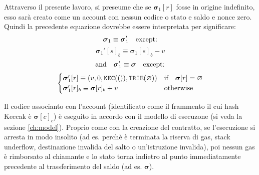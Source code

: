 \documentclass[9pt,oneside]{amsart}
\begin{document}
\begin{multicols}{2}
Attraverso il presente lavoro, si preseume che se $\boldsymbol{\sigma}_1[r]$ fosse in origine indefinito, esso sarà creato come un account con nessun codice o stato e saldo e nonce zero. Quindi la precedente equazione dovrebbe essere interpretata per significare:
\begin{equation}
\boldsymbol{\sigma}_1 \equiv \boldsymbol{\sigma}_1' \quad \text{except:} \\
\end{equation}
\begin{equation}
\boldsymbol{\sigma}_1'[s]_b \equiv \boldsymbol{\sigma}_1[s]_b - v
\end{equation}
\begin{equation}
\text{and}\quad \boldsymbol{\sigma}_1' \equiv \boldsymbol{\sigma} \quad \text{except:} \\
\end{equation}
\begin{equation}
\begin{cases}
\boldsymbol{\sigma}_1'[r] \equiv (v, 0, \mathtt{\tiny KEC}(()), \mathtt{\tiny TRIE}(\varnothing)) & \text{if} \quad \boldsymbol{\sigma}[r] = \varnothing \\
\boldsymbol{\sigma}_1'[r]_b \equiv \boldsymbol{\sigma}[r]_b + v & \text{otherwise}
\end{cases}
\end{equation}

Il codice associanto con l'account (identificato come il frammento il cui hash Keccak è $\boldsymbol{\sigma}[c]_c$) è eseguito in accordo con il modello di esecuzone (si veda la sezione \ref{ch:model}). Proprio come con la creazione del contratto, se l'esecuzione si arresta in modo insolito (ad es. perchè è terminata la riserva di gas, stack underflow, destinazione invalida del salto o un'istruzione invalida), poi nessun gas è rimborsato al chiamante e lo stato torna indietro al punto immediatamente precedente al trassferimento del saldo (ad es. $\boldsymbol{\sigma}$).


\end{multicols}
\end{document}
